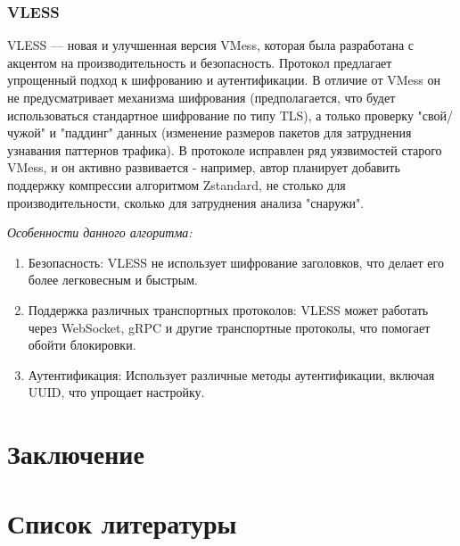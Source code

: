 \documentclass[utf8,14pt,a4paper,oneside,russian]{book}
\begin{document}
\subsubsection{VLESS}
VLESS — новая и улучшенная версия VMess, которая была разработана с акцентом на производительность и безопасность.
Протокол предлагает упрощенный подход к шифрованию и аутентификации. В отличие от VMess он не предусматривает механизма шифрования
(предполагается, что будет использоваться стандартное шифрование по типу TLS), а только проверку "свой/чужой" и "паддинг" данных
(изменение размеров пакетов для затруднения узнавания паттернов трафика). В протоколе исправлен ряд уязвимостей старого VMess,
и он активно развивается - например, автор планирует добавить поддержку компрессии алгоритмом Zstandard, не столько для производительности,
сколько для затруднения анализа "снаружи".

\textit{Особенности данного алгоритма:}
\begin{enumerate}
    \item Безопасность: VLESS не использует шифрование заголовков, что делает его более легковесным и быстрым.
    \item Поддержка различных транспортных протоколов: VLESS может работать через WebSocket, gRPC и другие транспортные протоколы, что помогает обойти блокировки.
    \item Аутентификация: Использует различные методы аутентификации, включая UUID, что упрощает настройку.
\end{enumerate}


\newpage
\section{Заключение}



\newpage
\section{Список литературы}
\end{document}
